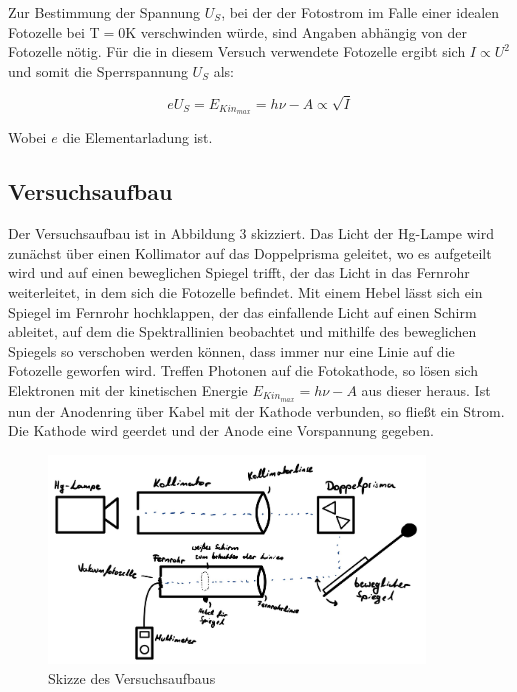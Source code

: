 \documentclass{article}
\begin{document}
\newpage

Zur Bestimmung der Spannung $U_S$, bei der der Fotostrom im Falle einer idealen Fotozelle bei T$=$0K verschwinden würde, sind Angaben abhängig von der Fotozelle nötig. Für die in diesem Versuch verwendete Fotozelle ergibt sich $I \propto U^2$ und somit die Sperrspannung $U_S$ als:

\begin{equation}
    e U_S = E_{Kin_{max}} = h \nu - A \propto \sqrt{I}
\end{equation}

Wobei $e$ die Elementarladung ist.

\newpage

\subsection{Versuchsaufbau}

Der Versuchsaufbau ist in Abbildung 3 skizziert. Das Licht der Hg-Lampe wird zunächst über einen Kollimator auf das Doppelprisma geleitet, wo es aufgeteilt wird und auf einen beweglichen Spiegel trifft, der das Licht in das Fernrohr weiterleitet, in dem sich die Fotozelle befindet. Mit einem Hebel lässt sich ein Spiegel im Fernrohr hochklappen, der das einfallende Licht auf einen Schirm ableitet, auf dem die Spektrallinien beobachtet und mithilfe des beweglichen Spiegels so verschoben werden können, dass immer nur eine Linie auf die Fotozelle geworfen wird. Treffen Photonen auf die Fotokathode, so lösen sich Elektronen mit der kinetischen Energie $E_{Kin_{max}} = h \nu - A$ aus dieser heraus. Ist nun der Anodenring über Kabel mit der Kathode verbunden, so fließt ein Strom. Die Kathode wird geerdet und der Anode eine Vorspannung gegeben.

\begin{figure} [!ht]
    \centering
    \includegraphics[width=10cm]{graphics/abb3.jpg}
    \caption{Skizze des Versuchsaufbaus}
\end{figure}
\end{document}
